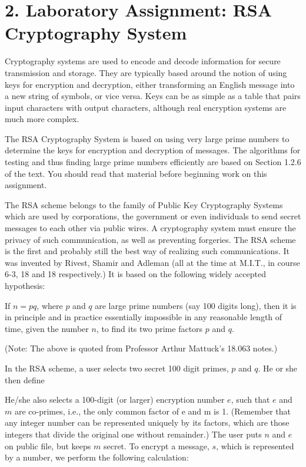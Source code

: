 \endbullets

\chapter{2. Laboratory Assignment: RSA Cryptography System}

Cryptography systems are used to encode and decode information for
secure transmission and storage.  They are typically based around the
notion of using keys for encryption and decryption, either transforming
an English message into a new string of symbols, or vice versa.  Keys
can be as simple as a table that pairs input characters with output
characters, although real encryption systems are much more complex.

The RSA Cryptography System is based on using very large prime numbers
to determine the keys for encryption and decryption of messages.  The
algorithms for testing and thus finding large prime numbers efficiently
are based on Section 1.2.6 of the text.  You should read that material before
beginning work on this assignment.

The RSA scheme belongs to the family of Public Key Cryptography Systems which
are used by corporations, the government or even individuals to send secret
messages to each other via public wires.  A cryptography system must ensure
the privacy of such communication, as well as preventing forgeries.
The RSA scheme is the first and probably still the best way of realizing such
communications.  It was invented by Rivest, Shamir and Adleman (all at the
time at M.I.T., in course 6-3, 18 and 18 respectively.)  It is based on the
following widely accepted hypothesis:

\beginquote
If $n=pq$, where $p$ and $q$ are large prime numbers (say 100 digits long), then
it is in principle and in practice essentially impossible in any reasonable
length of time, given the number $n$, to find its two prime factors $p$ and
$q$.
\endquote

(Note: The above is quoted from Professor Arthur Mattuck's 18.063 notes.)

In the RSA scheme, a user selects two secret 100 digit primes, $p$ and $q$.
He or she then define

He/she also selects a 100-digit (or larger) encryption number $e$, such that
$e$ and $m$ are co-primes, i.e., the only common factor of e and m is 1.
(Remember that any integer number can be represented uniquely by its
factors, which are those integers that divide the original one without
remainder.)
The
user puts $n$ and $e$ on public file, but keeps $m$ secret.  To encrypt a message,
$s$, which is represented by a number, we perform the following calculation:

